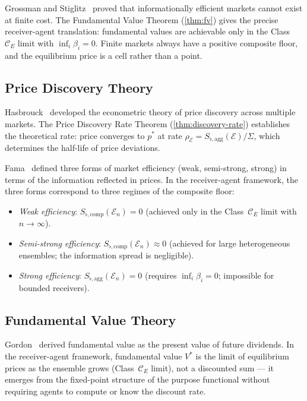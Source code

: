 \documentclass[twocolumn,11pt,a4paper]{article}
\theoremstyle{remark}
\newcommand{\Ens}{\mathcal{E}}
\newcommand{\MidP}{p^*}                  %
\newcommand{\FV}{V^*}                    %
\newcommand{\SflatT}{S_{\flat,\mathrm{agg}}}        %
\newcommand{\SflatI}{S_{\flat,\mathrm{comp}}}       %
\newcommand{\srad}{\rho}               %
\begin{document}
Grossman and Stiglitz~\cite{grossmanstiglitz1980} proved that informationally
efficient markets cannot exist at finite cost.  The Fundamental Value Theorem
(\cref{thm:fv}) gives the precise receiver-agent translation: fundamental
values are achievable only in the Class~$\mathcal{C}_E$ limit with
$\inf_i \beta_i = 0$.  Finite markets always have a positive composite floor,
and the equilibrium price is a cell rather than a point.

\subsection{Price Discovery Theory}
\label{sec:lit:disc}

Hasbrouck~\cite{hasbrouck1995} developed the econometric theory of price
discovery across multiple markets.  The Price Discovery Rate Theorem
(\cref{thm:discovery-rate}) establishes the theoretical rate: price converges
to $\MidP$ at rate $\srad_\Ens = \SflatT(\Ens)/\Sigma$, which determines
the half-life of price deviations.

Fama~\cite{fama1970} defined three forms of market efficiency (weak,
semi-strong, strong) in terms of the information reflected in prices.  In
the receiver-agent framework, the three forms correspond to three regimes
of the composite floor:
\begin{itemize}
\item \emph{Weak efficiency}: $\SflatI(\Ens_n) = 0$ (achieved only in the
  Class~$\mathcal{C}_E$ limit with $n \to \infty$).
\item \emph{Semi-strong efficiency}: $\SflatI(\Ens_n) \approx 0$ (achieved
  for large heterogeneous ensembles; the information spread is negligible).
\item \emph{Strong efficiency}: $\SflatT(\Ens_n) = 0$ (requires $\inf_i
  \beta_i = 0$; impossible for bounded receivers).
\end{itemize}

\subsection{Fundamental Value Theory}
\label{sec:lit:fv}

Gordon~\cite{gordon1959} derived fundamental value as the present value of
future dividends.  In the receiver-agent framework, fundamental value $\FV$
is the limit of equilibrium prices as the ensemble grows (Class~$\mathcal{C}_E$
limit), not a discounted sum — it emerges from the fixed-point structure of
the purpose functional without requiring agents to compute or know the
discount rate.
\end{document}
